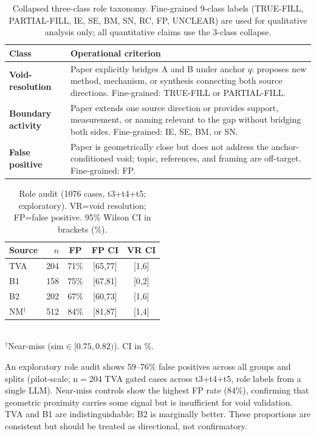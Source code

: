 \documentclass[11pt,twocolumn]{article}
\begin{document}
\begin{table}[h!]
\centering\small
\caption{Collapsed three-class role taxonomy. Fine-grained 9-class labels
(TRUE-FILL, PARTIAL-FILL, IE, SE, BM, SN, RC, FP, UNCLEAR) are used for
qualitative analysis only; all quantitative claims use the 3-class collapse.}
\label{tab:rubric}
\begin{tabular}{p{1.8cm}p{4.5cm}}
\toprule
Class & Operational criterion \\
\midrule
\textbf{Void-resolution} & Paper explicitly bridges A and B under anchor $q$:
proposes new method, mechanism, or synthesis connecting both source directions.
Fine-grained: TRUE-FILL or PARTIAL-FILL. \\
\textbf{Boundary activity} & Paper extends one source direction or provides support,
measurement, or naming relevant to the gap without bridging both sides.
Fine-grained: IE, SE, BM, or SN. \\
\textbf{False positive} & Paper is geometrically close but does not address the
anchor-conditioned void; topic, references, and framing are off-target.
Fine-grained: FP. \\
\bottomrule
\end{tabular}
\end{table}

\begin{table}[h!]
\centering\small
\caption{Role audit (1076 cases, t3+t4+t5; exploratory). VR=void resolution; FP=false positive. 95\% Wilson CI in brackets (\%).}
\begin{tabular}{lrccc}
\toprule
Source & $n$ & FP & FP CI & VR CI \\
\midrule
TVA   & 204 & 71\% & [65,77] & [1,6] \\
B1    & 158 & 75\% & [67,81] & [0,2] \\
B2    & 202 & 67\% & [60,73] & [1,6] \\
NM$^\dagger$ & 512 & 84\% & [81,87] & [1,4] \\
\bottomrule
\end{tabular}\\[2pt]
{\footnotesize $^\dagger$Near-miss (sim$\in[0.75,0.82)$). CI in \%.}
\end{table}

An exploratory role audit shows 59--76\% false positives across all groups and splits
(pilot-scale; n$=$204 TVA gated cases across t3+t4+t5, role labels from a single LLM).
Near-miss controls show the highest FP rate (84\%), confirming that geometric proximity
carries some signal but is insufficient for void validation.
TVA and B1 are indistinguishable; B2 is marginally better.
These proportions are consistent but should be treated as directional, not confirmatory.
\end{document}
